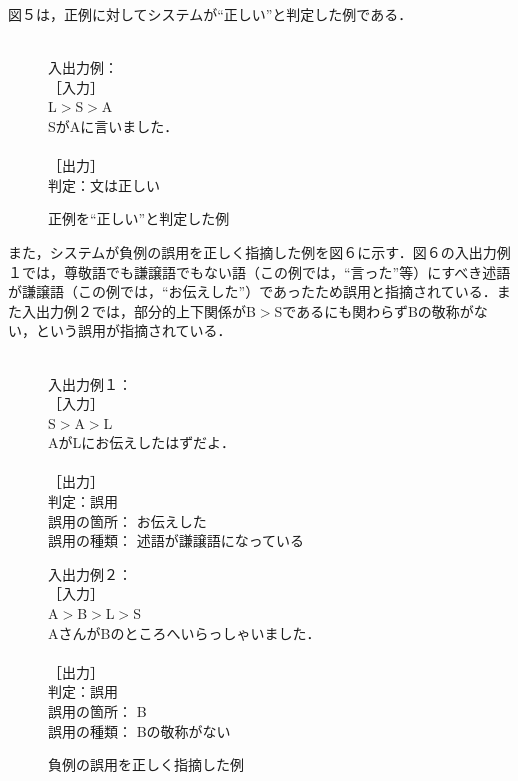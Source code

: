 図５は，正例に対してシステムが``正しい''と判定した例である．

\begin{figure}[htbp]
\begin{center}
\fbox
{
\begin{minipage}{35mm}
\baselineskip=4mm
　\\
入出力例：\\
［入力］\\ 
L$>$S$>$A\\
SがAに言いました．\\
　\\
［出力］\\
判定：文は正しい\\
\end{minipage}
}
\caption{正例を``正しい''と判定した例}
\label{fig:figure5}
\end{center}
\end{figure}

また，システムが負例の誤用を正しく指摘した例を図６に示す．図６の入出力例１では，尊敬語でも謙譲語でもない語（この例では，``言った''等）にすべき述語が謙譲語（この例では，\mbox{``お伝えした''）}であったため誤用と指摘されている．また入出力例２では，部分的上下関係がB$>$Sであるにも関わらずBの敬称がない，という誤用が指摘されている．

\begin{figure}[htbp]
\begin{center}
\fbox
{
\begin{minipage}{65mm}
\baselineskip=4mm
　\\
入出力例１：\\
［入力］\\
S$>$A$>$L\\
AがLにお伝えしたはずだよ．\\
　\\
［出力］\\
判定：誤用\\
誤用の箇所： お伝えした\\
誤用の種類： 述語が謙譲語になっている\\

\bigskip

入出力例２：\\
［入力］\\
A$>$B$>$L$>$S\\
AさんがBのところへいらっしゃいました．\\
　\\
［出力］\\
判定：誤用 \\
誤用の箇所： B\\
誤用の種類： Bの敬称がない\\
\end{minipage}
}
\caption{負例の誤用を正しく指摘した例}
\label{fig:figure6}
\end{center}
\end{figure}

